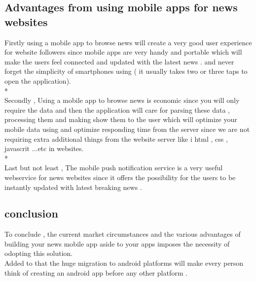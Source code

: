 \subsection{Advantages from using mobile apps for news websites }
Firstly using a mobile app to browse news will create a very good user experience for website followers since mobile apps are very handy and portable which will make the users feel connected and updated with the latest news  . and never forget the simplicity of smartphones using ( it usually takes two or three taps to open the application).
\\*
\\Secondly , Using a mobile app to browse news is economic since you will only require the data and then the application will care for parsing these data , processing them and making show them to the user which will optimize your mobile data using and optimize responding time from the server since we are not requiring extra additional things from the website server like i html , css , javascrit ...etc in websites.
\\*
\\Last but not least , The mobile push notification service is a very useful webservice for news websites  since it offers the possibility for the users to be instantly updated with latest breaking news . 
 \subsection{conclusion}
 To conclude , the current market circumstances and the various advantages of building your news mobile app aside to your apps imposes the necessity of odopting this solution.
 \\Added to that the huge migration to android platforms will make every person think of creating an android app before any other platform .   


